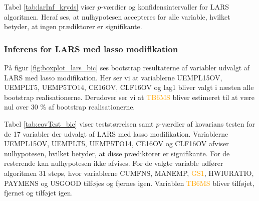 Tabel \ref{tab:larInf_kryds} viser \(p\)-værdier og konfidensintervaller for LARS algoritmen. 
Heraf ses, at nulhypotesen accepteres for alle variable, hvilket betyder, at ingen prædiktorer er signifikante.



\subsubsection{Inferens for LARS med lasso modifikation}
På figur \ref{fig:boxplot_lars_bic} ses bootstrap resultaterne af variabler udvalgt af LARS med lasso modifikation. 
Her ser vi at variablerne \textcolor{blue3}{UEMPL15OV}, \textcolor{blue3}{UEMPLT5}, \textcolor{blue3}{UEMP5TO14}, \textcolor{blue3}{CE16OV}, \textcolor{blue3}{CLF16OV} og \textcolor{blue3}{lag1} bliver valgt i næsten alle bootstrap realisationerne. Derudover ser vi at \textcolor{orange}{TB6MS} bliver estimeret til at være nul over 30 \% af bootstrap realisationerne. 

Tabel \ref{tab:covTest_bic} viser teststørrelsen samt $p$-værdier af kovarians testen for de 17 variabler der udvalgt af LARS med lasso modifikation. Variablerne  \textcolor{blue3}{UEMPL15OV}, \textcolor{blue3}{UEMPLT5}, \textcolor{blue3}{UEMP5TO14}, \textcolor{blue3}{CE16OV} og \textcolor{blue3}{CLF16OV} afviser nulhypotesen, hvilket betyder, at disse prædiktorer er signifikante. For de resterende kan nulhypotesen ikke afvises. 
For de valgte variable udfører algoritmen 31 steps, hvor variablerne \textcolor{chartreuse4}{CUMFNS}, \textcolor{blue3}{MANEMP}, \textcolor{orange}{GS1}, \textcolor{blue3}{HWIURATIO}, \textcolor{blue3}{PAYMENS} og \textcolor{blue3}{USGOOD} tilføjes og fjernes igen. 
Variablen \textcolor{orange}{TB6MS} bliver tilføjet, fjernet og tilføjet igen. 

